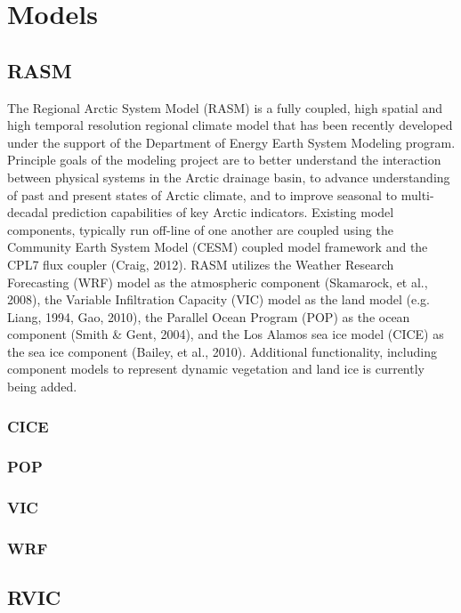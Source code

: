 \section{Models}

\subsection{RASM}

The Regional Arctic System Model (RASM) is a fully coupled, high spatial and high temporal resolution regional climate model that has been recently developed under the support of the Department of Energy Earth System Modeling program.
Principle goals of the modeling project are to better understand the interaction between physical systems in the Arctic drainage basin, to advance understanding of past and present states of Arctic climate, and to improve seasonal to multi-decadal prediction capabilities of key Arctic indicators.
Existing model components, typically run off-line of one another are coupled using the Community Earth System Model (CESM) coupled model framework and the CPL7 flux coupler (Craig, 2012).
RASM utilizes the Weather Research Forecasting (WRF) model as the atmospheric component (Skamarock, et al., 2008), the Variable Infiltration Capacity (VIC) model as the land model (e.g. Liang, 1994, Gao, 2010), the Parallel Ocean Program (POP) as the ocean component (Smith & Gent, 2004), and the Los Alamos sea ice model (CICE) as the sea ice component (Bailey, et al., 2010).
Additional functionality, including component models to represent dynamic vegetation and land ice is currently being added.

\subsubsection{CICE}

\subsubsection{POP}

\subsubsection{VIC}

\subsubsection{WRF}

\subsection{RVIC}

